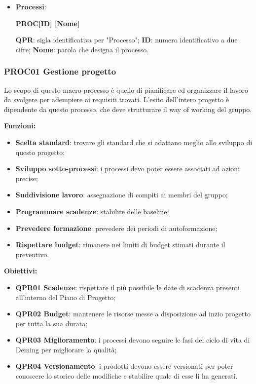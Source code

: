 \documentclass[../piano_di_qualifica.tex]{subfiles}
\begin{document}
\begin{itemize}
	\item \textbf{Processi}:
	      \begin{center}
		      \textbf{PROC[ID] [Nome]}
	      \end{center}
	      \subitem \textbf{QPR}: sigla identificativa per "Processo";
	      \subitem \textbf{ID}: numero identificativo a due cifre;
	      \subitem \textbf{Nome}: parola che designa il processo.
\end{itemize}

\subsubsection{PROC01 Gestione progetto}
Lo scopo di questo macro-processo è quello di pianificare ed organizzare il lavoro da svolgere per adempiere ai requisiti trovati. L'esito dell'intero progetto è dipendente da questo processo, che deve strutturare il way of working del gruppo.

\textbf{Funzioni:}
\begin{itemize}
	\item \textbf{Scelta standard}: trovare gli standard che si adattano meglio allo sviluppo di questo progetto;
	\item \textbf{Sviluppo sotto-processi}: i processi devo poter essere associati ad azioni precise;
	\item \textbf{Suddivisione lavoro}: assegnazione di compiti ai membri del gruppo;
	\item \textbf{Programmare scadenze}: stabilire delle baseline;
	\item \textbf{Prevedere formazione}: prevedere dei periodi di autoformazione;
	\item \textbf{Rispettare budget}: rimanere nei limiti di budget stimati durante il preventivo.
\end{itemize}

\textbf{Obiettivi:}
\begin{itemize}
	\item \textbf{QPR01 Scadenze}: rispettare il più possibile le date di scadenza presenti all'interno del Piano di Progetto;
	\item \textbf{QPR02 Budget}: mantenere le risorse messe a disposizione ad inzio progetto per tutta la sua durata;
	\item \textbf{QPR03 Miglioramento}: i processi devono seguire le fasi del ciclo di vita di Deming per migliorare la qualità;
	\item \textbf{QPR04 Versionamento}: i prodotti devono essere versionati per poter conoscere lo storico delle modifiche e stabilire quale di esse li ha generati.
\end{itemize}
\end{document}
